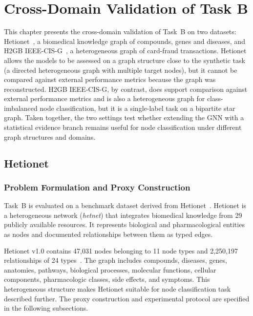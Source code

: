 \chapter{Cross-Domain Validation of Task B}
\label{ch:taskB-benchmark}
\label{subsec:benchmark-endpoint}

This chapter presents the cross-domain validation of Task~B on two datasets:
Hetionet~\cite{hetionet}, a biomedical knowledge graph of compounds, genes and diseases,
and {H2GB} {IEEE-CIS-G}~\cite{lin2025h2gb,h2gb}, a heterogeneous graph of card-fraud 
transactions.
Hetionet allows the models to be assessed on a graph structure close to the synthetic task
(a directed heterogeneous graph with multiple target nodes), but it cannot be compared
against external performance metrics because the graph was reconstructed.
{H2GB} {IEEE-CIS-G}, by contrast, does support comparison against external performance
metrics and is also a heterogeneous graph for class-imbalanced node classification,
but it is a single-label task on a bipartite star graph.
Taken together, the two settings test whether extending the GNN with a
statistical evidence branch remains useful for node classification under different
graph structures and domains.

\section{Hetionet}
\label{sec:hetionet}

\subsection{Problem Formulation and Proxy Construction}
\label{sec:hetionet-problem}

Task~B is evaluated on a benchmark dataset derived from Hetionet~\cite{hetionet}. 
Hetionet is a heterogeneous network
(\emph{hetnet}) that integrates biomedical knowledge from 29 publicly
available resources. It represents biological and pharmacological entities
as nodes and documented relationships between them as typed edges.

Hetionet v1.0 contains 47{,}031 nodes belonging to 11 node types and
2{,}250{,}197 relationships of 24 types~\cite{himmelstein2017hetionet}. The graph includes compounds,
diseases, genes, anatomies, pathways, biological processes, molecular
functions, cellular components, pharmacologic classes, side effects, and
symptoms. This heterogeneous structure makes Hetionet suitable for node classification task described further. 
The proxy construction and experimental protocol are specified in the following subsections.

